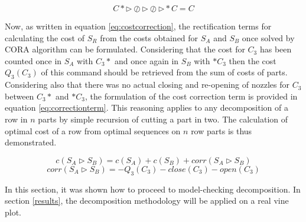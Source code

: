 \begin{equation}
    C* \triangleright \oslash \triangleright \oslash \triangleright *C = C \label{eq:ruleconcatparts}
\end{equation}

Now, as written in equation \ref{eq:costcorrection}, the rectification terms for calculating the cost of $S_R$ from the costs obtained for $S_A$ and $S_B$ once solved by CORA algorithm can be formulated. Considering that the cost for $C_3$ has been counted once in $S_A$ with $C_3 *$ and once again in $S_B$ with $*C_3$ then the cost $Q_{3}(C_{3})$ of this command should be retrieved from the sum of costs of parts. Considering also that there was no actual closing and re-opening of nozzles for $C_3$ between $C_3 *$ and $*C_3$, the formulation of the cost correction term is provided in equation \ref{eq:correctionterm}. This reasoning applies to any decomposition of a row in $n$ parts by simple recursion of cutting a part in two. The calculation of optimal cost of a row from optimal sequences on $n$ row parts is thus demonstrated.

\begin{equation}
c(S_A \triangleright S_B)=c(S_A)+c(S_B)+corr(S_A \triangleright S_B) \label{eq:costcorrection}
\end{equation}
 \vspace{-1em}
\begin{equation}
corr(S_A \triangleright S_B)= - Q_{3}(C_{3}) - close(C_{3}) - open(C_{3}) \label{eq:correctionterm}
\end{equation}


In this section, it was shown how to proceed to model-checking decomposition.
In section \ref{results}, the decomposition methodology will be applied on a real vine plot.


